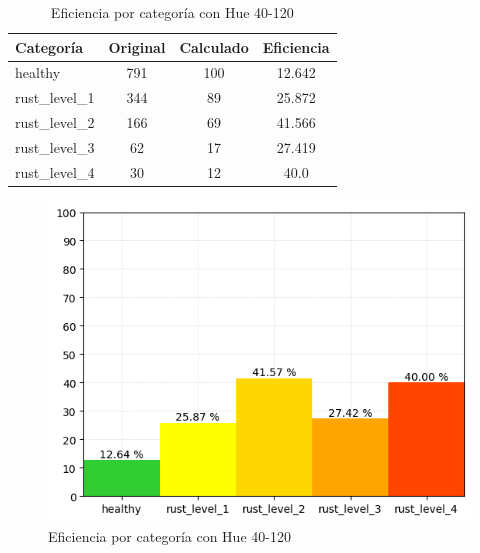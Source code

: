 \captionsetup[figure]{skip=10pt}

\begin{table}[H]
\centering
\begin{tabular}{|l|c|c|c|}
\hline 
\textbf{Categoría} & \textbf{Original} & \textbf{Calculado} & \textbf{Eficiencia} \\
\hline
healthy & 791 & 100 & 12.642 \\
\hline 
rust\_level\_1 & 344 & 89 & 25.872 \\
\hline 
rust\_level\_2 & 166 & 69 & 41.566 \\
\hline 
rust\_level\_3 & 62 & 17 & 27.419 \\
\hline 
rust\_level\_4 & 30 & 12 & 40.0 \\
\hline 
\end{tabular}
\caption{Eficiencia por categoría con Hue 40-120}
\label{table:efficiency_categories_40_120}
\end{table}

\begin{figure}[H]
\centering
\includegraphics[scale=0.6]{images/result_classes_40_120.png}
\caption{Eficiencia por categoría con Hue 40-120}
\label{img:efficiency_categories_40_120}
\end{figure}
